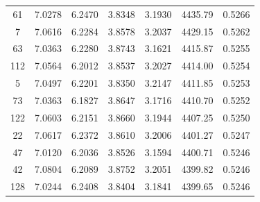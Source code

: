 \documentclass[12pt,a4paper]{article}
\begin{document}
\begin{longtable}{ccccccc}
61  & 7.0278 & 6.2470 & 3.8348 & 3.1930 & 4435.79 & 0.5266 \\
7   & 7.0616 & 6.2284 & 3.8578 & 3.2037 & 4429.15 & 0.5262 \\
63  & 7.0363 & 6.2280 & 3.8743 & 3.1621 & 4415.87 & 0.5255 \\
112 & 7.0564 & 6.2012 & 3.8537 & 3.2027 & 4414.00 & 0.5254 \\
5   & 7.0497 & 6.2201 & 3.8350 & 3.2147 & 4411.85 & 0.5253 \\
73  & 7.0363 & 6.1827 & 3.8647 & 3.1716 & 4410.70 & 0.5252 \\
122 & 7.0603 & 6.2151 & 3.8660 & 3.1944 & 4407.25 & 0.5250 \\
22  & 7.0617 & 6.2372 & 3.8610 & 3.2006 & 4401.27 & 0.5247 \\
47  & 7.0120 & 6.2036 & 3.8526 & 3.1594 & 4400.71 & 0.5246 \\
42  & 7.0804 & 6.2089 & 3.8752 & 3.2051 & 4399.82 & 0.5246 \\
128 & 7.0244 & 6.2408 & 3.8404 & 3.1841 & 4399.65 & 0.5246 \\
\end{longtable}
\end{document}
